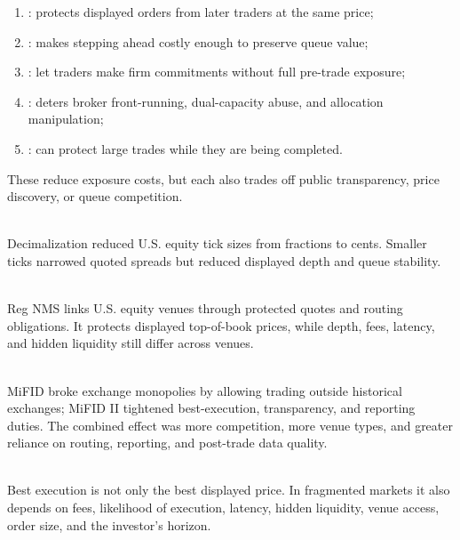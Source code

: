 \documentclass[a4paper,oneside,openany]{book}
\begin{document}
\begin{taxonomy} 
\begin{enumerate}[label=\roman*.]
\setlength{\itemsep}{0pt}
\item {}: protects displayed orders from later traders at the same price;
\item {}: makes stepping ahead costly enough to preserve queue value;
\item {}: let traders make firm commitments without full pre-trade exposure;
\item {}: deters broker front-running, dual-capacity abuse, and allocation manipulation;
\item {}: can protect large trades while they are being completed.
\end{enumerate}
These reduce exposure costs, but each also trades off public transparency, price discovery, or queue competition.
\end{taxonomy}

\begin{marketrule} \\
Decimalization reduced U.S. equity tick sizes from fractions to cents. Smaller ticks narrowed quoted spreads but reduced displayed depth and queue stability.
\end{marketrule}

\begin{marketrule} \\
Reg NMS links U.S. equity venues through protected quotes and routing obligations. It protects displayed top-of-book prices, while depth, fees, latency, and hidden liquidity still differ across venues.
\end{marketrule}

\begin{marketrule} \\
MiFID broke exchange monopolies by allowing trading outside historical exchanges; MiFID II tightened best-execution, transparency, and reporting duties. The combined effect was more competition, more venue types, and greater reliance on routing, reporting, and post-trade data quality.
\end{marketrule}

\begin{principle} \\
Best execution is not only the best displayed price. In fragmented markets it also depends on fees, likelihood of execution, latency, hidden liquidity, venue access, order size, and the investor's horizon.
\end{principle}
\end{document}
